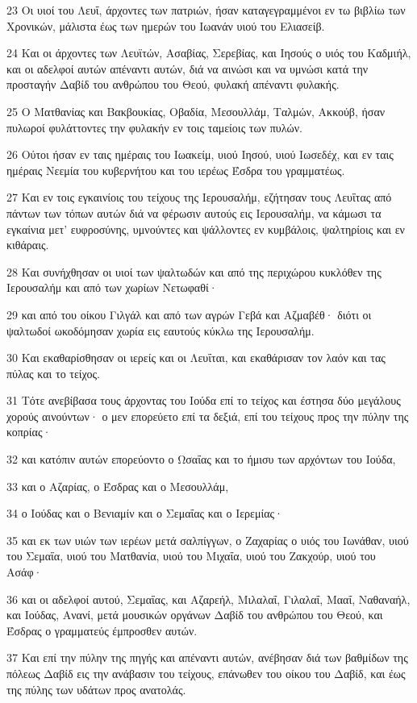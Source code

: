 \par 23 Οι υιοί του Λευΐ, άρχοντες των πατριών, ήσαν καταγεγραμμένοι εν τω βιβλίω των Χρονικών, μάλιστα έως των ημερών του Ιωανάν υιού του Ελιασείβ.
\par 24 Και οι άρχοντες των Λευϊτών, Ασαβίας, Σερεβίας, και Ιησούς ο υιός του Καδμιήλ, και οι αδελφοί αυτών απέναντι αυτών, διά να αινώσι και να υμνώσι κατά την προσταγήν Δαβίδ του ανθρώπου του Θεού, φυλακή απέναντι φυλακής.
\par 25 Ο Ματθανίας και Βακβουκίας, Οβαδία, Μεσουλλάμ, Ταλμών, Ακκούβ, ήσαν πυλωροί φυλάττοντες την φυλακήν εν τοις ταμείοις των πυλών.
\par 26 Ούτοι ήσαν εν ταις ημέραις του Ιωακείμ, υιού Ιησού, υιού Ιωσεδέχ, και εν ταις ημέραις Νεεμία του κυβερνήτου και του ιερέως Έσδρα του γραμματέως.
\par 27 Και εν τοις εγκαινίοις του τείχους της Ιερουσαλήμ, εζήτησαν τους Λευΐτας από πάντων των τόπων αυτών διά να φέρωσιν αυτούς εις Ιερουσαλήμ, να κάμωσι τα εγκαίνια μετ' ευφροσύνης, υμνούντες και ψάλλοντες εν κυμβάλοις, ψαλτηρίοις και εν κιθάραις.
\par 28 Και συνήχθησαν οι υιοί των ψαλτωδών και από της περιχώρου κυκλόθεν της Ιερουσαλήμ και από των χωρίων Νετωφαθί·
\par 29 και από του οίκου Γιλγάλ και από των αγρών Γεβά και Αζμαβέθ· διότι οι ψαλτωδοί ωκοδόμησαν χωρία εις εαυτούς κύκλω της Ιερουσαλήμ.
\par 30 Και εκαθαρίσθησαν οι ιερείς και οι Λευΐται, και εκαθάρισαν τον λαόν και τας πύλας και το τείχος.
\par 31 Τότε ανεβίβασα τους άρχοντας του Ιούδα επί το τείχος και έστησα δύο μεγάλους χορούς αινούντων· ο μεν επορεύετο επί τα δεξιά, επί του τείχους προς την πύλην της κοπρίας·
\par 32 και κατόπιν αυτών επορεύοντο ο Ωσαΐας και το ήμισυ των αρχόντων του Ιούδα,
\par 33 και ο Αζαρίας, ο Έσδρας και ο Μεσουλλάμ,
\par 34 ο Ιούδας και ο Βενιαμίν και ο Σεμαΐας και ο Ιερεμίας·
\par 35 και εκ των υιών των ιερέων μετά σαλπίγγων, ο Ζαχαρίας ο υιός του Ιωνάθαν, υιού του Σεμαΐα, υιού του Ματθανία, υιού του Μιχαΐα, υιού του Ζακχούρ, υιού του Ασάφ·
\par 36 και οι αδελφοί αυτού, Σεμαΐας, και Αζαρεήλ, Μιλαλαΐ, Γιλαλαΐ, Μααΐ, Ναθαναήλ, και Ιούδας, Ανανί, μετά μουσικών οργάνων Δαβίδ του ανθρώπου του Θεού, και Έσδρας ο γραμματεύς έμπροσθεν αυτών.
\par 37 Και επί την πύλην της πηγής και απέναντι αυτών, ανέβησαν διά των βαθμίδων της πόλεως Δαβίδ εις την ανάβασιν του τείχους, επάνωθεν του οίκου του Δαβίδ, και έως της πύλης των υδάτων προς ανατολάς.

